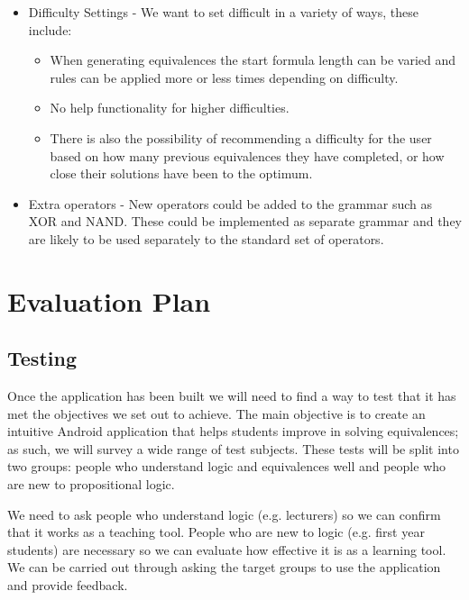 \documentclass{report}
\begin{document}
\begin{enumerate}
\begin{itemize}
\item Difficulty Settings - We want to set difficult in a variety of ways, these include:

\begin{itemize}
\item When generating equivalences the start formula length can be varied and rules can be applied more or less times depending on difficulty.
\item No help functionality for higher difficulties.
\item There is also the possibility of recommending a difficulty for the user based on how many previous equivalences they have completed, or how close their solutions have been to the optimum.
\end{itemize}

\item Extra operators - New operators could be added to the grammar such as XOR and NAND. These could be implemented as separate grammar and they are likely to be used separately to the standard set of operators.
\end{itemize}

\end{enumerate}

\chapter{Evaluation Plan}

\section{Testing}

Once the application has been built we will need to find a way to test that it has met the objectives we set out to achieve. The main objective is to create an intuitive Android application that helps students improve in solving equivalences; as such, we will survey a wide range of test subjects. These tests will be split into two groups: people who understand logic and equivalences well and people who are new to propositional logic.

We need to ask people who understand logic (e.g. lecturers) so we can confirm that it works as a teaching tool. People who are new to logic (e.g. first year students) are necessary so we can evaluate how effective it is as a learning tool. We can be carried out through asking the target groups to use the application and provide feedback.
\end{document}
